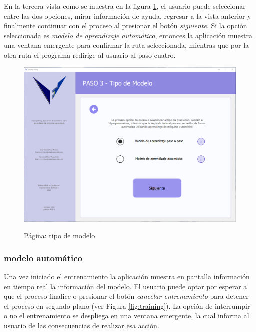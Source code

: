 En la tercera vista como se muestra en la figura \ref{fig:modeltype}, el usuario puede seleccionar entre las dos opciones, mirar información de ayuda, regresar a la vista anterior y finalmente continuar con el proceso al presionar el botón \textit{siguiente}. Si la opción seleccionada es \textit{modelo de aprendizaje automático}, entonces la aplicación muestra una ventana emergente para confirmar la ruta seleccionada, mientras que por la otra ruta el programa redirige al usuario al paso cuatro.

\begin{figure}[H]
    \centering
    \caption{Página: tipo de modelo}
    \includegraphics[width=\textwidth]{views/model.png}
    \label{fig:modeltype}
\end{figure}

\subsubsection{modelo automático}

Una vez iniciado el entrenamiento la aplicación muestra en pantalla información en tiempo real la información del modelo. El usuario puede optar por esperar a que el proceso finalice o presionar el botón \textit{cancelar entrenamiento} para detener el proceso en segundo plano (ver Figura \ref{fig:training}). La opción de interrumpir o no el entrenamiento se despliega en una ventana emergente, la cual informa al usuario de las consecuencias de realizar esa acción.

